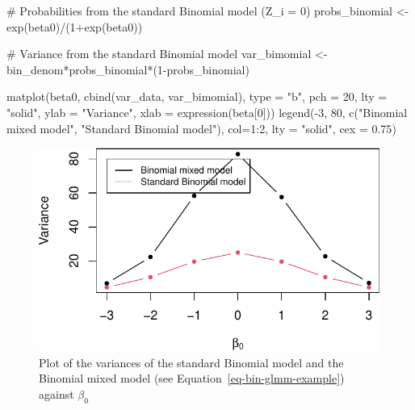 \documentclass[
  letterpaper,
]{krantz}
\newenvironment{Shaded}{\begin{snugshade}}{\end{snugshade}}
\newcommand{\AttributeTok}[1]{\textcolor[rgb]{0.40,0.45,0.13}{#1}}
\newcommand{\CommentTok}[1]{\textcolor[rgb]{0.37,0.37,0.37}{#1}}
\newcommand{\DecValTok}[1]{\textcolor[rgb]{0.68,0.00,0.00}{#1}}
\newcommand{\FloatTok}[1]{\textcolor[rgb]{0.68,0.00,0.00}{#1}}
\newcommand{\FunctionTok}[1]{\textcolor[rgb]{0.28,0.35,0.67}{#1}}
\newcommand{\NormalTok}[1]{\textcolor[rgb]{0.00,0.23,0.31}{#1}}
\newcommand{\OtherTok}[1]{\textcolor[rgb]{0.00,0.23,0.31}{#1}}
\newcommand{\SpecialCharTok}[1]{\textcolor[rgb]{0.37,0.37,0.37}{#1}}
\newcommand{\StringTok}[1]{\textcolor[rgb]{0.13,0.47,0.30}{#1}}
\begin{document}
\begin{Shaded}
\begin{Highlighting}[]
\CommentTok{\# Probabilities from the standard Binomial model (Z\_i = 0)}
\NormalTok{probs\_binomial }\OtherTok{\textless{}{-}} \FunctionTok{exp}\NormalTok{(beta0)}\SpecialCharTok{/}\NormalTok{(}\DecValTok{1}\SpecialCharTok{+}\FunctionTok{exp}\NormalTok{(beta0))}

\CommentTok{\# Variance from the standard Binomial model}
\NormalTok{var\_bimomial }\OtherTok{\textless{}{-}}\NormalTok{ bin\_denom}\SpecialCharTok{*}\NormalTok{probs\_binomial}\SpecialCharTok{*}\NormalTok{(}\DecValTok{1}\SpecialCharTok{{-}}\NormalTok{probs\_binomial)}
\end{Highlighting}
\end{Shaded}

\begin{Shaded}
\begin{Highlighting}[]
\FunctionTok{matplot}\NormalTok{(beta0, }\FunctionTok{cbind}\NormalTok{(var\_data, var\_bimomial), }\AttributeTok{type =} \StringTok{"b"}\NormalTok{, }\AttributeTok{pch =} \DecValTok{20}\NormalTok{,}
        \AttributeTok{lty =} \StringTok{"solid"}\NormalTok{, }\AttributeTok{ylab =} \StringTok{"Variance"}\NormalTok{, }\AttributeTok{xlab =} \FunctionTok{expression}\NormalTok{(beta[}\DecValTok{0}\NormalTok{]))}
\FunctionTok{legend}\NormalTok{(}\SpecialCharTok{{-}}\DecValTok{3}\NormalTok{, }\DecValTok{80}\NormalTok{, }\FunctionTok{c}\NormalTok{(}\StringTok{"Binomial mixed model"}\NormalTok{, }\StringTok{"Standard Binomial model"}\NormalTok{),}
       \AttributeTok{col=}\DecValTok{1}\SpecialCharTok{:}\DecValTok{2}\NormalTok{, }\AttributeTok{lty =} \StringTok{"solid"}\NormalTok{, }\AttributeTok{cex =} \FloatTok{0.75}\NormalTok{)}
\end{Highlighting}
\end{Shaded}

\begin{figure}[H]

{\centering \includegraphics{03_model-fitting_files/figure-pdf/fig-var-bin-glmm-1.pdf}

}

\caption{\label{fig-var-bin-glmm}Plot of the variances of the standard
Binomial model and the Binomial mixed model (see
Equation~\ref{eq-bin-glmm-example}) against \(\beta_0\)}

\end{figure}
\end{document}

